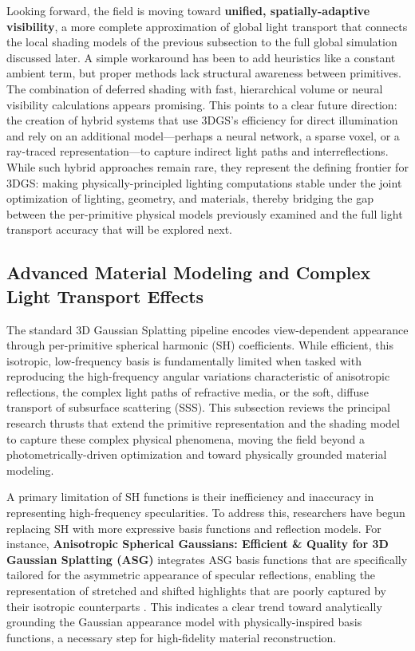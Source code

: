 \documentclass[11pt,a4paper]{article}
\begin{document}
Looking forward, the field is moving toward \textbf{unified, spatially-adaptive visibility}, a more complete approximation of global light transport that connects the local shading models of the previous subsection to the full global simulation discussed later. A simple workaround has been to add heuristics like a constant ambient term, but proper methods lack structural awareness between primitives. The combination of deferred shading with fast, hierarchical volume or neural visibility calculations appears promising. This points to a clear future direction: the creation of hybrid systems that use 3DGS's efficiency for direct illumination and rely on an additional model---perhaps a neural network, a sparse voxel, or a ray-traced representation---to capture indirect light paths and interreflections. While such hybrid approaches remain rare, they represent the defining frontier for 3DGS: making physically-principled lighting computations stable under the joint optimization of lighting, geometry, and materials, thereby bridging the gap between the per-primitive physical models previously examined and the full light transport accuracy that will be explored next.


\subsection{Advanced Material Modeling and Complex Light Transport Effects}


The standard 3D Gaussian Splatting pipeline encodes view-dependent appearance through per-primitive spherical harmonic (SH) coefficients. While efficient, this isotropic, low-frequency basis is fundamentally limited when tasked with reproducing the high-frequency angular variations characteristic of anisotropic reflections, the complex light paths of refractive media, or the soft, diffuse transport of subsurface scattering (SSS). This subsection reviews the principal research thrusts that extend the primitive representation and the shading model to capture these complex physical phenomena, moving the field beyond a photometrically-driven optimization and toward physically grounded material modeling.

A primary limitation of SH functions is their inefficiency and inaccuracy in representing high-frequency specularities. To address this, researchers have begun replacing SH with more expressive basis functions and reflection models. For instance, \textbf{Anisotropic Spherical Gaussians: Efficient \& Quality for 3D Gaussian Splatting (ASG)} integrates ASG basis functions that are specifically tailored for the asymmetric appearance of specular reflections, enabling the representation of stretched and shifted highlights that are poorly captured by their isotropic counterparts \cite{arxiv:2402.15870v1}. This indicates a clear trend toward analytically grounding the Gaussian appearance model with physically-inspired basis functions, a necessary step for high-fidelity material reconstruction.
\end{document}
